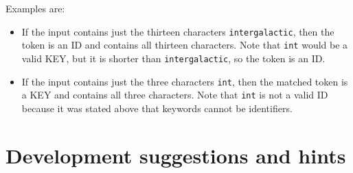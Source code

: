 \documentclass[11pt]{article}
\begin{document}
      Examples are:

      \vspace{-2.5mm}

      \begin{itemize}

        \addtolength{\itemsep}{-1mm}

        \item If the input contains just the thirteen characters
              \texttt{intergalactic}, then the token is an ID and contains all
              thirteen characters.  Note that \texttt{int} would be a valid
              KEY, but it is shorter than \texttt{intergalactic}, so the token
              is an ID.

        \item If the input contains just the three characters \texttt{int},
              then the matched token is a KEY and contains all three
              characters.  Note that \texttt{int} is not a valid ID because
              it was stated above that keywords cannot be identifiers.

      \end{itemize}

      \vspace{-4.5mm}

  \section{Development suggestions and hints}
\end{document}
